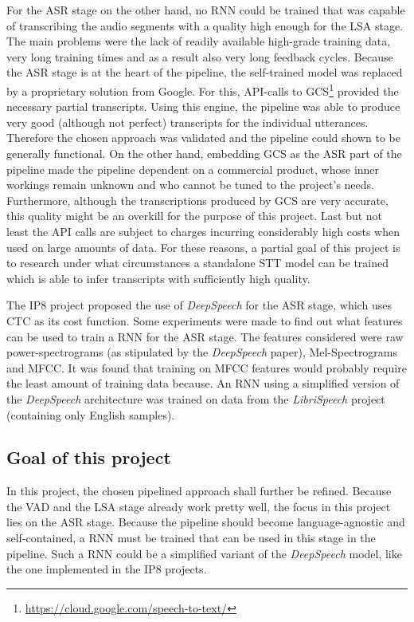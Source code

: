 For the \ac{ASR} stage on the other hand, no \ac{RNN} could be trained that was capable of transcribing the audio segments with a quality high enough for the \ac{LSA} stage. The main problems were the lack of readily available high-grade training data, very long training times and as a result also very long feedback cycles. Because the \ac{ASR} stage is at the heart of the pipeline, the self-trained model was replaced by a proprietary solution from Google. For this, API-calls to \ac{GCS}\footnote{\url{https://cloud.google.com/speech-to-text/}} provided the necessary partial transcripts. Using this engine, the pipeline was able to produce very good (although not perfect) transcripts for the individual utterances. Therefore the chosen approach was validated and the pipeline could shown to be generally functional. On the other hand, embedding \ac{GCS} as the \ac{ASR} part of the pipeline made the pipeline dependent on a commercial product, whose inner workings remain unknown and who cannot be tuned to the project's needs. Furthermore, although the transcriptions produced by \ac{GCS} are very accurate, this quality might be an overkill for the purpose of this project. Last but not least the API calls are subject to charges incurring considerably high costs when used on large amounts of data. For these reasons, a partial goal of this project is to research under what circumstances a standalone \ac{STT} model can be trained which is able to infer transcripts with sufficiently high quality.

The IP8 project proposed the use of \textit{DeepSpeech} for the \ac{ASR} stage, which uses \ac{CTC} \parencite{ctc_paper} as its cost function. Some experiments were made to find out what features can be used to train a \ac{RNN} for the \ac{ASR} stage. The features considered were raw power-spectrograms (as stipulated by the \textit{DeepSpeech} paper), Mel-Spectrograms and \ac{MFCC}. It was found that training on \ac{MFCC} features would probably require the least amount of training data because. An \ac{RNN} using a simplified version of the \textit{DeepSpeech} architecture was trained on data from the \textit{LibriSpeech} project (containing only English samples).

\subsection{Goal of this project}

In this project, the chosen pipelined approach shall further be refined. Because the \ac{VAD} and the \ac{LSA} stage already work pretty well, the focus in this project lies on the \ac{ASR} stage. Because the pipeline should become language-agnostic and self-contained, a \ac{RNN} must be trained that can be used in this stage in the pipeline. Such a \ac{RNN} could be a simplified variant of the \textit{DeepSpeech} model, like the one implemented in the IP8 projects. 

